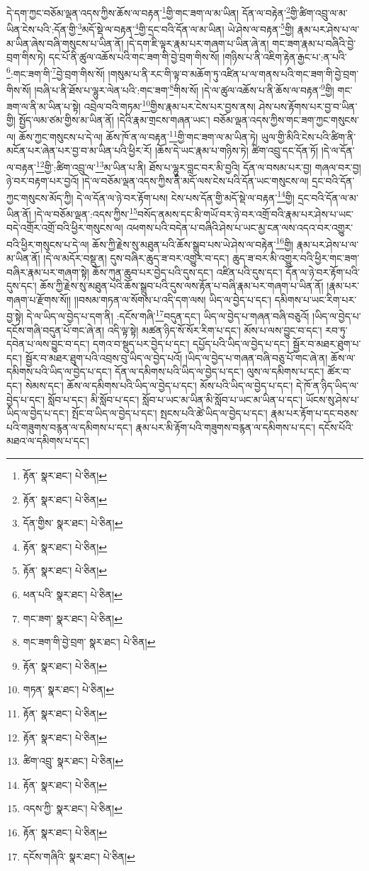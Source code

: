 དེ་དག་ཀྱང་བཅོམ་ལྡན་འདས་ཀྱིས་ཆོས་ལ་བརྟན་\footnote{རྟོན་  སྣར་ཐང་།  པེ་ཅིན། }གྱི་གང་ཟག་ལ་མ་ཡིན། དོན་ལ་བརྟེན་\footnote{རྟོན་  སྣར་ཐང་།  པེ་ཅིན། }གྱི་ཚིག་འབྲུ་ལ་མ་ཡིན་ངེས་པའི་:དོན་གྱི་\footnote{དོན་གྱིས་  སྣར་ཐང་།  པེ་ཅིན། }མདོ་སྡེ་ལ་བརྟན་\footnote{རྟོན་  སྣར་ཐང་།  པེ་ཅིན། }གྱི་དྲང་བའི་དོན་ལ་མ་ཡིན། ཡེ་ཤེས་ལ་བརྟན་\footnote{རྟོན་  སྣར་ཐང་།  པེ་ཅིན། }གྱི། རྣམ་པར་ཤེས་པ་ལ་མ་ཡིན་ཞེས་བཞི་གསུངས་པ་ཡིན་ནོ། །དེ་དག་ཇི་ལྟར་རྣམ་པར་གཞག་པ་ཡིན་ཞེ་ན། གང་ཟག་རྣམ་པ་བཞིའི་བྱེ་བྲག་གིས་ཏེ། དང་པོ་ནི་ཚུལ་འཆོས་པའི་གང་ཟག་གི་བྱེ་བྲག་གིས་སོ། །གཉིས་པ་ནི་འཇིག་རྟེན་རྒྱང་པ་:ན་པའི་\footnote{ཕན་པའི་  སྣར་ཐང་།  པེ་ཅིན། }:གང་ཟག་གི་\footnote{གང་ཟག་  སྣར་ཐང་།  པེ་ཅིན། }བྱེ་བྲག་གིས་སོ། །གསུམ་པ་ནི་རང་གི་ལྟ་བ་མཆོག་ཏུ་འཛིན་པ་ལ་གནས་པའི་གང་ཟག་གི་བྱེ་བྲག་གིས་སོ། །བཞི་པ་ནི་ཐོས་པ་ལྷུར་ལེན་པའི་:གང་ཟག་\footnote{གང་ཟག་གི་བྱེ་བྲག་  སྣར་ཐང་།  པེ་ཅིན། }གིས་སོ། །དེ་ལ་ཚུལ་འཆོས་པ་ནི་ཆོས་ལ་བརྟན་\footnote{རྟོན་  སྣར་ཐང་།  པེ་ཅིན། }གྱི། གང་ཟག་ལ་ནི་མ་ཡིན་པ་སྟེ། འབྲེལ་བའི་གཏམ་\footnote{གཏན་  སྣར་ཐང་།  པེ་ཅིན། }གྱིས་རྣམ་པར་ངེས་པར་བྱས་ནས། ཤེས་པས་རྟོགས་པར་བྱ་བ་ཡིན་གྱི། སྤྱོད་ལམ་ཙམ་གྱིས་མ་ཡིན་ནོ། །དེའི་རྣམ་གྲངས་གཞན་ཡང་། བཅོམ་ལྡན་འདས་ཀྱིས་གང་ཟག་ཀྱང་གསུངས་ལ། ཆོས་ཀྱང་གསུངས་པ་དེ་ལ། ཆོས་ཁོ་ན་ལ་བརྟན་\footnote{རྟོན་  སྣར་ཐང་།  པེ་ཅིན། }གྱི་གང་ཟག་ལ་མ་ཡིན་ཏེ། ཡུལ་གྱི་མིའི་ངེས་པའི་ཚིག་ནི་མངོན་པར་ཞེན་པར་བྱ་བ་མ་ཡིན་པའི་ཕྱིར་རོ། །ཆོས་དེ་ཡང་རྣམ་པ་གཉིས་ཏེ། ཚིག་འབྲུ་དང་དོན་ཏོ། །དེ་ལ་དོན་ལ་བརྟན་\footnote{རྟོན་  སྣར་ཐང་།  པེ་ཅིན། }གྱི་:ཚིག་འབྲུ་ལ་\footnote{ཚིག་འབྲུ་  སྣར་ཐང་།  པེ་ཅིན། }མ་ཡིན་པ་ནི། ཐོས་པ་ལྷུར་བླང་བར་མི་བྱའི། དོན་ལ་བསམ་པར་བྱ། གཞལ་བར་བྱ། ཉེ་བར་བརྟག་པར་བྱའོ། །དེ་ལ་བཅོམ་ལྡན་འདས་ཀྱིས་ནི་མདོ་ལས་ངེས་པའི་དོན་ཡང་གསུངས་ལ། དྲང་བའི་དོན་ཀྱང་གསུངས་མོད་ཀྱི། དེ་ལ་དོན་ལ་ཉེ་བར་རྟོག་པས། ངེས་པས་དོན་གྱི་མདོ་སྡེ་ལ་བརྟན་\footnote{རྟོན་  སྣར་ཐང་།  པེ་ཅིན། }གྱི། དྲང་བའི་དོན་ལ་མ་ཡིན་ནོ། །དེ་ལ་བཅོམ་ལྡན་:འདས་ཀྱིས་\footnote{འདས་ཀྱི་  སྣར་ཐང་།  པེ་ཅིན། }བསོད་ནམས་དང་མི་གཡོ་བར་ཉེ་བར་འགྲོ་བའི་རྣམ་པར་ཤེས་པ་ཡང་བདེ་འགྲོར་འགྲོ་བའི་ཕྱིར་གསུངས་ལ། འཕགས་པའི་བདེན་པ་བཞིའི་ཤེས་པ་ཡང་མྱ་ངན་ལས་འདའ་བར་འགྱུར་བའི་ཕྱིར་གསུངས་པ་དེ་ལ། ཆོས་ཀྱི་རྗེས་སུ་མཐུན་པའི་ཆོས་སྒྲུབ་པས་ཡེ་ཤེས་ལ་བརྟེན་\footnote{རྟོན་  སྣར་ཐང་།  པེ་ཅིན། }གྱི། རྣམ་པར་ཤེས་པ་ལ་མ་ཡིན་ནོ། །དེ་ལ་མདོར་བསྡུ་ན། དུས་བཞིར་ཆུད་ཟ་བར་འགྱུར་བ་དང་། ཆུད་ཟ་བར་མི་འགྱུར་བའི་ཕྱིར་གང་ཟག་བཞིར་རྣམ་པར་གཞག་སྟེ། ཆོས་ཀུན་ཆུབ་པར་བྱེད་པའི་དུས་དང་། འཛིན་པའི་དུས་དང་། དོན་ལ་ཉེ་བར་རྟོག་པའི་དུས་དང་། ཆོས་ཀྱི་རྗེས་སུ་མཐུན་པའི་ཆོས་སྒྲུབ་པའི་དུས་ལས་རྟོན་པ་བཞི་རྣམ་པར་གཞག་པ་ཡིན་ནོ། །རྣམ་པར་གཞག་པ་རྫོགས་སོ།། །།བསམ་གཏན་ལ་སོགས་པ་འདི་དག་ལས། ཡིད་ལ་བྱེད་པ་དང་། དམིགས་པ་ཡང་རིག་པར་བྱ་སྟེ། དེ་ལ་ཡིད་ལ་བྱེད་པ་དག་ནི། :དངོས་གཞི་\footnote{དངོས་གཞིའི་  སྣར་ཐང་།  པེ་ཅིན། }བདུན་དང་། ཡིད་ལ་བྱེད་པ་གཞན་བཞི་བཅུའོ། །ཡིད་ལ་བྱེད་པ་དངོས་གཞི་བདུན་པོ་གང་ཞེ་ན། འདི་ལྟ་སྟེ། མཚན་ཉིད་སོ་སོར་རིག་པ་དང་། མོས་པ་ལས་བྱུང་བ་དང་། རབ་ཏུ་དབེན་པ་ལས་བྱུང་བ་དང་། དགའ་བ་སྡུད་པར་བྱེད་པ་དང་། དཔྱོད་པའི་ཡིད་ལ་བྱེད་པ་དང་། སྦྱོར་བ་མཐར་ཐུག་པ་དང་། སྦྱོར་བ་མཐར་ཐུག་པའི་འབྲས་བུ་ཡིད་ལ་བྱེད་པའོ། །ཡིད་ལ་བྱེད་པ་གཞན་བཞི་བཅུ་པོ་གང་ཞེ་ན། ཆོས་ལ་དམིགས་པའི་ཡིད་ལ་བྱེད་པ་དང་། དོན་ལ་དམིགས་པའི་ཡིད་ལ་བྱེད་པ་དང་། ལུས་ལ་དམིགས་པ་དང་། ཚོར་བ་དང་། སེམས་དང་། ཆོས་ལ་དམིགས་པའི་ཡིད་ལ་བྱེད་པ་དང་། མོས་པའི་ཡིད་ལ་བྱེད་པ་དང་། དེ་ཁོ་ན་ཉིད་ཡིད་ལ་བྱེད་པ་དང་། སློབ་པ་དང་། མི་སློབ་པ་དང་། སློབ་པ་ཡང་མ་ཡིན་མི་སློབ་པ་ཡང་མ་ཡིན་པ་དང་། ཡོངས་སུ་ཤེས་པ་ཡིད་ལ་བྱེད་པ་དང་། སྤོང་བ་ཡིད་ལ་བྱེད་པ་དང་། སྤངས་པའི་ཚེ་ཡིད་ལ་བྱེད་པ་དང་། རྣམ་པར་རྟོག་པ་དང་བཅས་པའི་གཟུགས་བརྙན་ལ་དམིགས་པ་དང་། རྣམ་པར་མི་རྟོག་པའི་གཟུགས་བརྙན་ལ་དམིགས་པ་དང་། དངོས་པོའི་མཐའ་ལ་དམིགས་པ་དང་། 